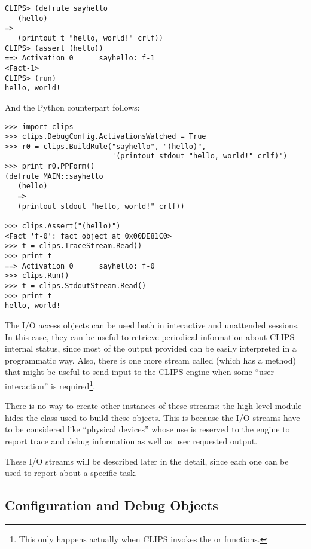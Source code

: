 \begin{verbatim}
CLIPS> (defrule sayhello
   (hello)
=>
   (printout t "hello, world!" crlf))
CLIPS> (assert (hello))
==> Activation 0      sayhello: f-1
<Fact-1>
CLIPS> (run)
hello, world!
\end{verbatim}

And the Python counterpart follows:

\begin{verbatim}
>>> import clips
>>> clips.DebugConfig.ActivationsWatched = True
>>> r0 = clips.BuildRule("sayhello", "(hello)",
                         '(printout stdout "hello, world!" crlf)')
>>> print r0.PPForm()
(defrule MAIN::sayhello
   (hello)
   =>
   (printout stdout "hello, world!" crlf))

>>> clips.Assert("(hello)")
<Fact 'f-0': fact object at 0x00DE81C0>
>>> t = clips.TraceStream.Read()
>>> print t
==> Activation 0      sayhello: f-0
>>> clips.Run()
>>> t = clips.StdoutStream.Read()
>>> print t
hello, world!
\end{verbatim}

The I/O access objects can be used both in interactive and unattended
sessions. In this case, they can be useful to retrieve periodical
information about CLIPS internal status, since most of the output
provided can be easily interpreted in a programmatic way. Also, there
is one more stream called  (which has a
 method) that might be useful to send input to the
CLIPS engine when some ``user interaction'' is required\footnote{This only
happens actually when CLIPS invokes the  or 
functions.}.

There is no way to create other instances of these streams: the
high-level module hides the class used to build these objects. This
is because the I/O streams have to be considered like ``physical
devices'' whose use is reserved to the engine to report trace and
debug information as well as user requested output.

These I/O streams will be described later in the detail, since each
one can be used to report about a specific task.



\subsection{Configuration and Debug Objects\label{pyclips-ov-cado}}


